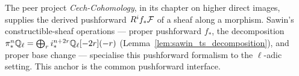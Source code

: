 \begin{definition}
  \label{def:peer_higher_direct_image}
  The peer project \emph{Cech-Cohomology}, in its chapter on higher direct
  images, supplies the derived pushforward $R^i f_* \mathcal{F}$ of a sheaf along a
  morphism.  Sawin's constructible-sheaf operations --- proper pushforward
  $f_*$, the decomposition $\pi^n_*\mathbb{Q}_\ell = \bigoplus_r i^{n+2r}_*
  \mathbb{Q}_\ell[-2r](-r)$ (Lemma~\ref{lem:sawin_ts_decomposition}), and proper base
  change --- specialise this pushforward formalism to the $\ell$-adic setting.
  This anchor is the common pushforward interface.
\end{definition}
